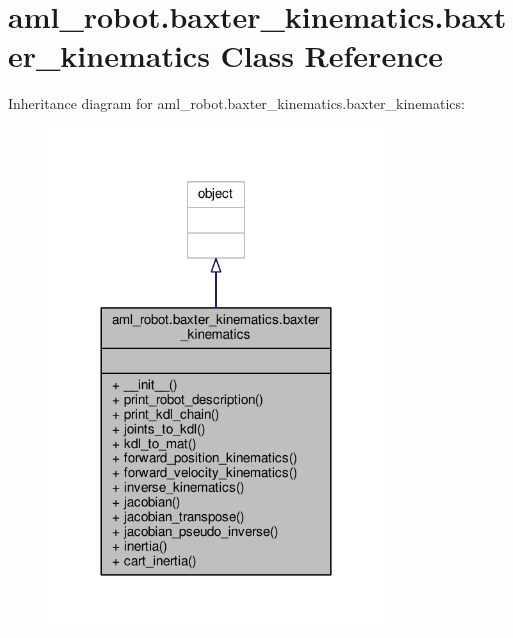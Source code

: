 \hypertarget{classaml__robot_1_1baxter__kinematics_1_1baxter__kinematics}{\section{aml\-\_\-robot.\-baxter\-\_\-kinematics.\-baxter\-\_\-kinematics Class Reference}
\label{classaml__robot_1_1baxter__kinematics_1_1baxter__kinematics}
}


Inheritance diagram for aml\-\_\-robot.\-baxter\-\_\-kinematics.\-baxter\-\_\-kinematics\-:
\nopagebreak
\begin{figure}[H]
\begin{center}
\leavevmode
\includegraphics[width=252pt]{classaml__robot_1_1baxter__kinematics_1_1baxter__kinematics__inherit__graph}
\end{center}
\end{figure}


